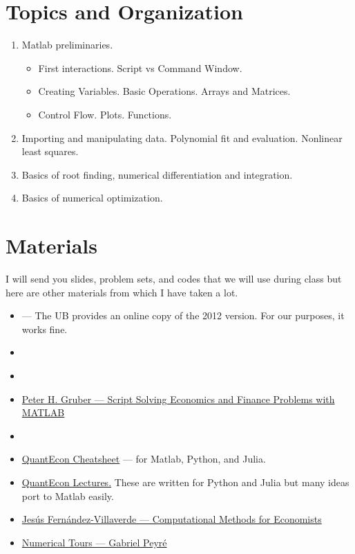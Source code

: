 \documentclass[a4paper,12pt]{article}
\begin{document}
\section{Topics and Organization}

\begin{enumerate}[label={\textbf{Session \arabic*}}]
    \item Matlab preliminaries. 
    \begin{itemize}
        \item First interactions. Script vs Command Window.
        \item Creating Variables. Basic Operations. Arrays and Matrices.
        \item Control Flow. Plots. Functions.
    \end{itemize}
    \item Importing and manipulating data. Polynomial fit and evaluation. Nonlinear least squares.
    \item Basics of root finding, numerical differentiation and integration.
    \item Basics of numerical optimization.
\end{enumerate}

\section{Materials}

I will send you slides, problem sets, and codes that we will use during class but here are other materials from which I have taken a lot.

\begin{itemize}
    \item \href{https://www.elsevier.com/books/matlab/attaway/978-0-323-91750-6}{} --- The UB provides an online copy of the 2012 version. For our purposes, it works fine.
    \item \href{https://mitpress.mit.edu/books/numerical-methods-economics}{}
    \item \href{https://mitpress.mit.edu/books/algorithms-optimization}{}
    \item \href{https://people.lu.usi.ch/gruberp/MatlabMasterScript.pdf}{Peter H. Gruber --- Script Solving Economics and Finance Problems with MATLAB}
    \item \href{https://link-springer-com.sire.ub.edu/book/10.1007/978-0-387-40065-5}{}
    \item \href{https://cheatsheets.quantecon.org/index.html}{QuantEcon Cheatsheet} ---  for Matlab, Python, and Julia.
    \item \href{https://quantecon.org/lectures/}{QuantEcon Lectures.} These are written for Python and Julia but many ideas port to Matlab easily.
    \item \href{https://www.sas.upenn.edu/~jesusfv/teaching.html}{Jes\'us Fern\'andez-Villaverde --- Computational Methods for Economists}
    \item \href{http://www.numerical-tours.com/matlab/}{Numerical Tours --- Gabriel Peyr\'e}
\end{itemize}
\end{document}
